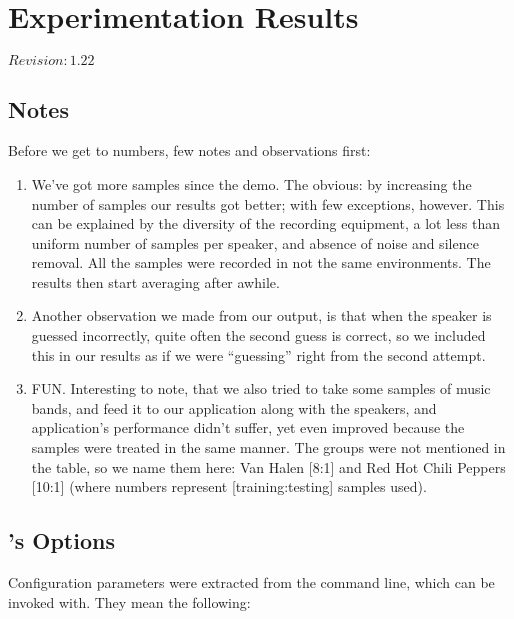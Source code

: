 \chapter{Experimentation Results}
\label{sect:results}

$Revision: 1.22 $

\section{Notes}

Before we get to numbers, few notes and observations first:

\begin{enumerate}

\item We've got more samples since the demo. The obvious: by increasing the number of samples our results got
      better; with few exceptions, however. This can be explained by
      the diversity of the recording equipment, a lot less than uniform
      number of samples per speaker, and absence of noise and silence
      removal. All the samples were recorded in not the same environments.
      The results then start averaging after awhile.

\item Another observation we made from our output, is that
      when the speaker is guessed incorrectly, quite often the second
      guess is correct, so we included this in our results as if we were
      ``guessing'' right from the second attempt.

\item FUN. Interesting to note, that we also tried to take some
      samples of music bands, and feed it to our application
      along with the speakers, and application's performance didn't suffer,
      yet even improved because the samples were treated in
      the same manner. The groups were not mentioned in the table,
      so we name them here: Van Halen [8:1] and Red Hot Chili Peppers [10:1] (where numbers
      represent [training:testing] samples used).

\end{enumerate}

\clearpage

\section{'s Options}

Configuration parameters were extracted from the command line,
which  can be invoked with. They mean the following:

